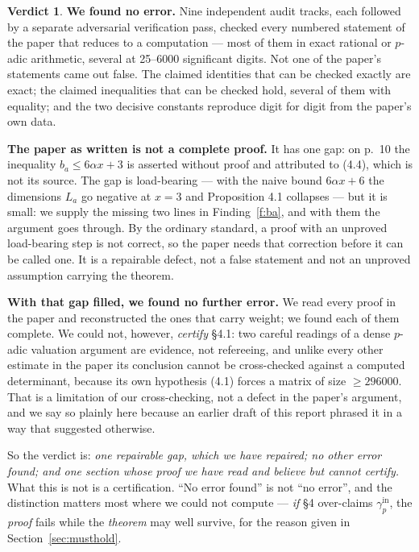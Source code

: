\documentclass[11pt]{article}
\theoremstyle{definition}
\newtheorem*{verdictbox}{Verdict}
\newcommand{\gin}{\gamma_p^{\mathrm{in}}}
\begin{document}
\begin{verdictbox}
\textbf{We found no error.} Nine independent audit tracks, each followed by a separate
adversarial verification pass, checked every numbered statement of the paper that reduces to a
computation --- most of them in exact rational or $p$-adic arithmetic, several at 25--6000
significant digits. Not one of the paper's statements came out false. The claimed identities
that can be checked exactly are exact; the claimed inequalities that can be checked hold,
several of them with equality; and the two decisive constants reproduce digit for digit from
the paper's own data.

\textbf{The paper as written is not a complete proof.} It has one gap: on p.~10 the
inequality $b_a\le 6\alpha x+3$ is asserted without proof and attributed to (4.4), which is not
its source. The gap is load-bearing --- with the naive bound $6\alpha x+6$ the dimensions $L_a$
go negative at $x=3$ and Proposition 4.1 collapses --- but it is small: we supply the missing
two lines in Finding~\ref{f:ba}, and with them the argument goes through. By the ordinary
standard, a proof with an unproved load-bearing step is not correct, so the paper needs that
correction before it can be called one. It is a repairable defect, not a false statement and
not an unproved assumption carrying the theorem.

\textbf{With that gap filled, we found no further error.} We read every proof in the paper and
reconstructed the ones that carry weight; we found each of them complete. We could not, however,
\emph{certify} \S4.1: two careful readings of a dense $p$-adic valuation argument are evidence,
not refereeing, and unlike every other estimate in the paper its conclusion cannot be
cross-checked against a computed determinant, because its own hypothesis (4.1) forces a matrix
of size $\ge296000$. That is a limitation of our cross-checking, not a defect in the paper's
argument, and we say so plainly here because an earlier draft of this report phrased it in a way
that suggested otherwise.

So the verdict is: \emph{one repairable gap, which we have repaired; no other error found; and
one section whose proof we have read and believe but cannot certify.} What this is not is a
certification. ``No error found'' is not ``no error'', and the distinction matters most where we
could not compute --- \emph{if} \S4 over-claims $\gin$, the \emph{proof} fails while the
\emph{theorem} may well survive, for the reason given in Section~\ref{sec:musthold}.
\end{verdictbox}
\end{document}
